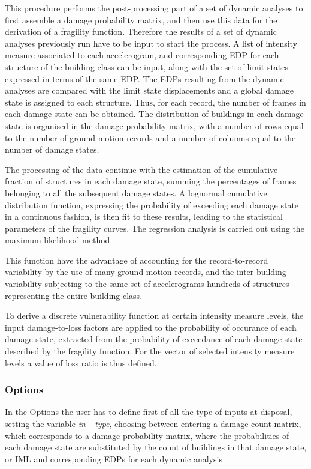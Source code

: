 This procedure performs the post-processing part of a set of dynamic analyses to first assemble a damage probability matrix, and then use this data for the derivation of a fragility function. Therefore the results of a set of dynamic analyses previously run have to be input to start the process. A list of intensity measure associated to each accelerogram, and corresponding EDP for each structure of the building class can be input, along with the set of limit states expressed in terms of the same EDP. The EDPs resulting from the dynamic analyses are compared with the limit state displacements and a global damage state is assigned to each structure. Thus, for each record, the number of frames in each damage state can be obtained. The distribution of buildings in each damage state is organised in the damage probability matrix, with a number of rows equal to the number of ground motion records and a number of columns equal to the number of damage states.

The processing of the data continue with the estimation of the cumulative fraction of structures in each damage state, summing the percentages of frames belonging to all the subsequent damage states. A lognormal cumulative distribution function, expressing the probability of exceeding each damage state in a continuous fashion, is then fit to these results, leading to the statistical parameters of the fragility curves. The regression analysis is carried out using the maximum likelihood method.

This function have the advantage of accounting for the record-to-record variability by the use of many ground motion records, and the inter-building variability subjecting to the same set of accelerograms hundreds of structures representing the entire building class.

To derive a discrete vulnerability function at certain intensity measure levels, the input damage-to-loss factors are applied to the probability of occurance of each damage state, extracted from the probability of exceedance of each damage state described by the fragility function. For the vector of selected intensity measure levels a value of loss ratio is thus defined.

\subsubsection{Options}
\label{subsubsec:NDMoptions}
In the Options the user has to define first of all the type of inputs at disposal, setting the variable \textit{in\_ type}, choosing between entering a damage count matrix, which corresponds to a damage probability matrix, where the probabilities of each damage state are substituted by the count of buildings in that damage state, or IML and corresponding EDPs for each dynamic analysis

